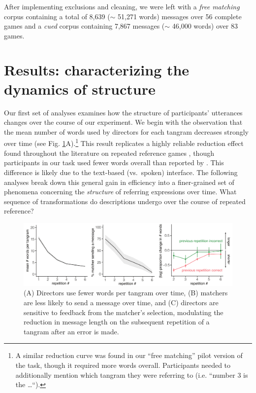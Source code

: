 \documentclass[alpha-refs]{wiley-article}
\begin{document}
\noindent After implementing exclusions and cleaning, we were left with a \emph{free matching} corpus containing a total of 8,639 ($\sim$ 51,271 words) messages over 56 complete games and a \emph{cued} corpus containing 7,867 messages ($\sim$ 46,000 words) over 83 games.


\section{Results: characterizing the dynamics of structure}
\label{sec:structure}

Our first set of analyses examines how the structure of participants' utterances changes over the course of our experiment.
We begin with the observation that the mean number of words used by directors for each tangram decreases strongly over time (see Fig. \ref{fig:feedback}A).\footnote{A similar reduction curve was found in our  ``free matching'' pilot version of the task, though it required more words overall. Participants needed to additionally mention which tangram they were referring to (i.e. ``number 3 is the \dots``).}
This result replicates a highly reliable reduction effect found throughout the literature on repeated reference games \citep[e.g.][]{KraussWeinheimer64_ReferencePhrases,BrennanClark96_ConceptualPactsConversation}, though participants in our task used fewer words overall than reported by \cite{ClarkWilkesGibbs86_ReferringCollaborative}.
This difference is likely due to the text-based (vs.~spoken) interface.
The following analyses break down this general gain in efficiency into a finer-grained set of phenomena concerning the \emph{structure} of referring expressions over time.
What sequence of transformations do descriptions undergo over the course of repeated reference?


\begin{figure}[t]
\centering
\includegraphics[scale=.64]{listenerFeedback_combined.pdf}
\caption{(A) Directors use fewer words per tangram over time, (B) matchers are less likely to send a message over time, and (C) directors are sensitive to feedback from the matcher's selection, modulating the reduction in message length on the subsequent repetition of a tangram after an error is made.}
\label{fig:feedback}
\end{figure}
\end{document}
